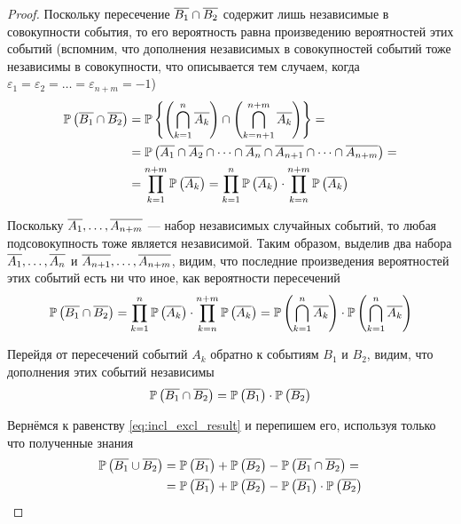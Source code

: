 \begin{proof}
    Поскольку пересечение $\overline{B_1}\cap \overline{B_2}$
    содержит лишь независимые в совокупности события,
    то его вероятность равна произведению вероятностей этих событий
    (вспомним, что дополнения независимых в совокупностей событий
    тоже независимы в совокупности, что описывается тем случаем, когда
    $\varepsilon_1=\varepsilon_2=\dots=\varepsilon_{n+m}=-1$)
    \begin{align*}
        \mathbb{P}\left( \overline{B_1}\cap \overline{B_2} \right)
            &=\mathbb{P}\left\{ 
                \left(\bigcap_{k=1}^n \overline{A_k}\right)
                \cap
                \left(\bigcap_{k=n+1}^{n+m} \overline{A_k}\right) \right\}=\\
            &=\mathbb{P}\left( 
                \overline{A_1}\cap\overline{A_2}\cap
                \dots\cap\overline{A_n}\cap\overline{A_{n+1}}\cap
                \dots\cap\overline{A_{n+m}} \right)=\\
            &=\prod_{k=1}^{n+m}\mathbb{P}\left( \overline{A_k} \right)
            =\prod_{k=1}^n \mathbb{P}\left( \overline{A_k} \right)
                \cdot\prod_{k=n}^{n+m} \mathbb{P}\left( \overline{A_k} \right)\\
    \end{align*}

    Поскольку $\overline{A_1}, \dots, \overline{A_{n+m}}$
    --- набор независимых случайных событий,
    то любая подсовокупность тоже является независимой.
    Таким образом, выделив два набора $\overline{A_1}, \dots, \overline{A_{n}}$
    и $\overline{A_{n+1}}, \dots, \overline{A_{n+m}}$, видим,
    что последние произведения вероятностей этих событий есть ни что иное,
    как вероятности пересечений
    $$\mathbb{P}\left( \overline{B_1}\cap \overline{B_2} \right)
        =\prod_{k=1}^n \mathbb{P}\left( \overline{A_k} \right)
            \cdot\prod_{k=n}^{n+m} \mathbb{P}\left( \overline{A_k} \right)
        =\mathbb{P}\left( \bigcap_{k=1}^{n} \overline{A_k} \right)
            \cdot\mathbb{P}\left( \bigcap_{k=1}^{n} \overline{A_k} \right)$$

    Перейдя от пересечений событий $A_k$ обратно к событиям $B_1$ и $B_2$,
    видим, что дополнения этих событий независимы
    $$\mathbb{P}\left( \overline{B_1}\cap \overline{B_2} \right)
        =\mathbb{P}\left( \overline{B_1} \right)\cdot\mathbb{P}\left( \overline{B_2} \right)$$

    Вернёмся к равенству \eqref{eq:incl_excl_result} и перепишем его,
    используя только что полученные знания
    \begin{align*}
    \mathbb{P}\left( \overline{B_1}\cup \overline{B_2} \right)
    &=\mathbb{P}\left( \overline{B_1} \right)+\mathbb{P}\left( \overline{B_2} \right)
        -\mathbb{P}\left( \overline{B_1}\cap \overline{B_2} \right)=\\
    &=\mathbb{P}\left( \overline{B_1} \right)+\mathbb{P}\left( \overline{B_2} \right)
        -\mathbb{P}\left( \overline{B_1} \right)\cdot \mathbb{P}\left( \overline{B_2} \right)
    \end{align*}


\end{proof}
